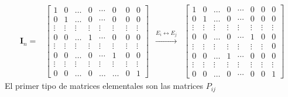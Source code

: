 \documentclass[
]{article}
\begin{document}
\begin{equation*}
\begin{array}{ccccc}
\mathbf{I}_n = &  \begin{bmatrix} 
                   1      & 0     & \ldots  & 0     & \cdots& 0      & 0       & 0      \\ 
                   0      & 1     & \ldots  & 0     & \cdots& 0      & 0       & 0      \\
                \vdots    & \vdots& \vdots  & \vdots& \vdots& \vdots & \vdots  & \vdots \\
                   0      &  0    & \ldots  & 1     & \cdots& 0      & 0       & 0      \\
                \vdots    & \vdots& \vdots  & \vdots& \vdots& \vdots& \vdots  & \vdots \\
                   0      &  0    & \ldots  & 0     & \cdots& 1      & 0       & 0      \\
                \vdots    & \vdots& \vdots  & \vdots& \vdots& \vdots & \vdots  & \vdots \\   
                  0       &  0    & \ldots  & 0     & \ldots& \ldots & 0      & 1
  \end{bmatrix}
 & \xrightarrow{ E_i\leftrightarrow E_j}
 &  \begin{bmatrix} 
     1      & 0     & \ldots  & 0     & \cdots  & 0      & 0       & 0      \\ 
     0      & 1     & \ldots  & 0     & \cdots  & 0      & 0       & 0      \\
  \vdots    & \vdots& \vdots  & \vdots& \vdots  & \vdots & \vdots  & \vdots \\
     0      &  0    & \ldots  & 0     & \cdots  & 1      & 0       & 0      \\
    \vdots  & \vdots& \vdots  & \vdots& \vdots  & \vdots & \vdots  & 0      \\
     0      &  0    & \ldots  & 1     & \cdots  & 0      & 0       & 0      \\
     \vdots & \vdots& \vdots  & \vdots& \vdots  & \vdots & \vdots  & \vdots \\
     0      &  0    & \ldots  & 0     & \cdots  & 0      & 0       & 1
  \end{bmatrix}
\end{array}
\end{equation*} El primer tipo de matrices elementales son las matrices
\(P_{ij}\)
\end{document}
